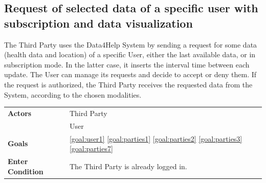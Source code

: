  \subsection{Request of selected data of a specific user with subscription and data visualization}
 
The Third Party uses the Data4Help System by sending a request for some data (health data and location) of a specific User, either the last available data, or in subscription mode.  
In the latter case, it inserts the interval time between each update.
The User can manage its requests and decide to accept or deny them. If the request is authorized, the Third Party receives the requested data from the System, according to the chosen modalities.

\begin{table}[H]
	\centering
    
    \begin{tabular}{|p{3.5cm}|p{10.3cm}|}
    
    \hline
    \textbf{\large{Actors}} & Third Party \\
	& User \\		 			
    \hline
    \textbf{\large{Goals}} 				&\ref{goal:user1} \ref{goal:parties1} \ref{goal:parties2} \ref{goal:parties3} \ref{goal:parties7}\\
    
    \hline
    \textbf{\large{Enter Condition}} & The Third Party is already logged in.\\
    

\end{tabular}
\end{table}
